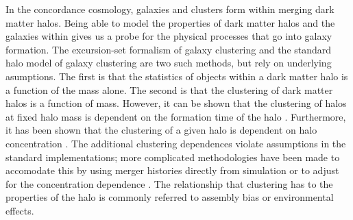 \documentclass[usenatbib,usegraphicx,letterpaper]{mn2e}
\begin{document}
In the concordance cosmology, galaxies and clusters form within merging dark matter halos\citep{white78, blumenthal84}. Being able to model the properties of dark matter halos and the galaxies within gives us a probe for the physical processes that go into galaxy formation. The excursion-set formalism of galaxy clustering \citep{bond91,lacey93,somerville99, zentner07} and the standard halo model of galaxy clustering \citep{seljak00, peacock00, scoccimarro01, berlind02, bullock02, cooray02} are two such methods, but rely on underlying asumptions. The first is that the statistics of objects within a dark matter halo is a function of the mass alone. The second is that the clustering of dark matter halos is a function of mass. However, it can be shown that the clustering of halos at fixed halo mass is dependent on the formation time of the halo \citep{wechsler02, sheth04, gao05, wechsler06, croton07, zentner07}. Furthermore, it has been shown that the clustering of a given halo is dependent on halo concentration \citep{wechsler02, wechsler06}.   The additional clustering dependences violate assumptions in the standard implementations; more complicated methodologies have been made to accomodate this by using merger histories directly from simulation \citep{dvorkin11} or to adjust for the concentration dependence \citep{gil11}. The relationship that clustering has to the properties of the halo is commonly referred to assembly bias or environmental effects.
\end{document}
